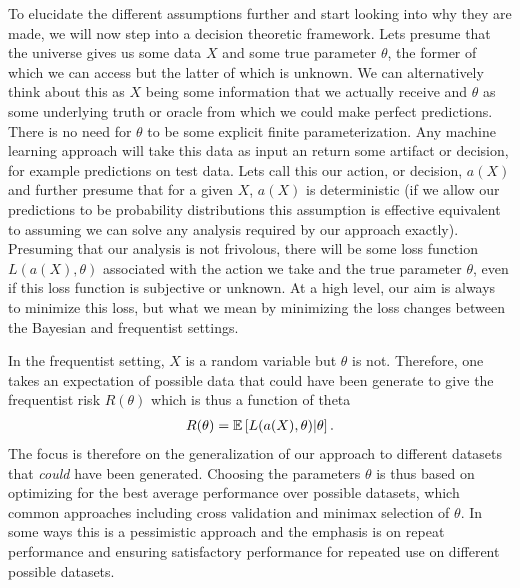To elucidate the
different assumptions further and start looking into why they are made, we will now step into a decision theoretic
framework.  Lets presume that the universe gives us some data $X$ and some true parameter $\theta$, the former of which
we can access but the latter of which is unknown.  We can alternatively think about this as $X$ being some information
that we actually receive and $\theta$ as some underlying truth or oracle from which we could make perfect predictions.  There is
no need for $\theta$ to be some explicit finite parameterization.  Any machine learning approach will take this data as input an
return some artifact or decision, for example predictions on test data.  Lets call this our action, or decision, $a(X)$
and further presume that for a given $X$, $a(X)$ is deterministic (if we allow our predictions to be probability
distributions this assumption is effective equivalent to assuming we can solve any analysis required by our approach exactly).
Presuming that our analysis is not frivolous, there will be some loss function $L(a(X),\theta)$ associated with the action we take
and the true parameter $\theta$, even if this loss function is subjective or unknown.  At a high level, our aim is always to
minimize this loss, but what we mean by minimizing the loss changes between the Bayesian and frequentist settings.  

In the
frequentist setting, $X$ is a random variable but $\theta$ is not.  Therefore, one takes an expectation of possible data
that could have been generate to give the frequentist risk $R(\theta)$ which is thus a function of theta~\cite{vapnik1998statistical}
\begin{align}
\label{eq:bayes:freq-risk}
R(\theta)  = \mathbb{E}\left[L(a(X),\theta) | \theta \right].
\end{align}
The focus is therefore on the generalization of our approach to different datasets that \emph{could} have been generated.
Choosing the parameters $\theta$ is thus based on optimizing for the best average performance over possible datasets,
which common approaches including cross validation and minimax selection of $\theta$.  In some ways this is a pessimistic
approach and the emphasis is on repeat performance and ensuring satisfactory performance for repeated use on different possible
datasets.  

